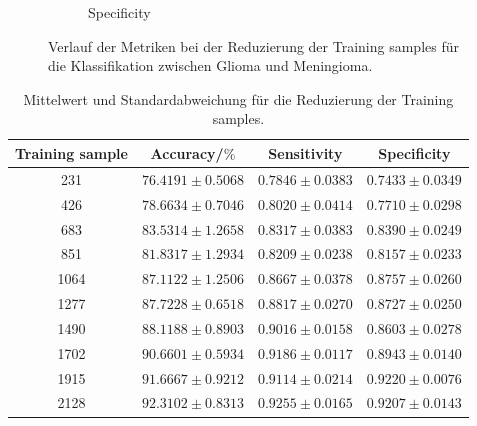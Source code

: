 \begin{figure}[H]
\begin{subfigure}[b]{0.48\textwidth}
    \caption{Specificity}
    \label{fig:gli-men-spec}
  \end{subfigure}
  \caption{Verlauf der Metriken bei der Reduzierung der Training samples für die Klassifikation zwischen Glioma und Meningioma.}
  \label{fig:gli-men-reduktion}
\end{figure}
\begin{table}[H]
    \centering
    {\small
        \begin{tabular}{cccc}
            \toprule
            Training sample & Accuracy/$\%$ & Sensitivity & Specificity\\
            \midrule
            231  & $76.4191 \pm 0.5068$ & $0.7846 \pm 0.0383$ & $0.7433 \pm 0.0349$\\
            426  & $78.6634 \pm 0.7046$ & $0.8020 \pm 0.0414$ & $0.7710 \pm 0.0298$\\
            683  & $83.5314 \pm 1.2658$ & $0.8317 \pm 0.0383$ & $0.8390 \pm 0.0249$\\
            851  & $81.8317 \pm 1.2934$ & $0.8209 \pm 0.0238$ & $0.8157 \pm 0.0233$\\
            1064 & $87.1122 \pm 1.2506$ & $0.8667 \pm 0.0378$ & $0.8757 \pm 0.0260$\\
            1277 & $87.7228 \pm 0.6518$ & $0.8817 \pm 0.0270$ & $0.8727 \pm 0.0250$\\
            1490 & $88.1188 \pm 0.8903$ & $0.9016 \pm 0.0158$ & $0.8603 \pm 0.0278$\\
            1702 & $90.6601 \pm 0.5934$ & $0.9186 \pm 0.0117$ & $0.8943 \pm 0.0140$\\
            1915 & $91.6667 \pm 0.9212$ & $0.9114 \pm 0.0214$ & $0.9220 \pm 0.0076$\\
            2128 & $92.3102 \pm 0.8313$ & $0.9255 \pm 0.0165$ & $0.9207 \pm 0.0143$\\            
            \bottomrule
        \end{tabular}}
  \caption{Mittelwert und Standardabweichung für die Reduzierung der Training samples.}
  \label{tab:Red-gli-men}
\end{table}
\vspace{-3.5em}

